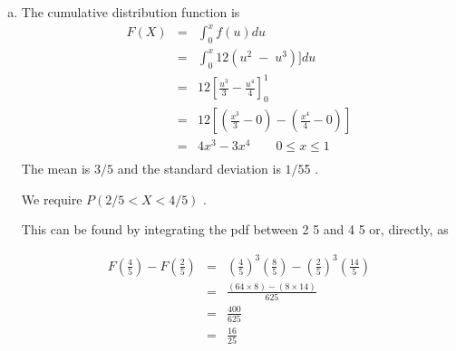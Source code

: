 \documentclass[a4paper,12pt]{article}
\begin{document}
\begin{enumerate}[(a)]
\begin{framed}
\end{framed}
\item  The cumulative distribution function is
\begin{eqnarray*}
F(X) &=& \int^{x}_{0} f(u) du \\
&=& \int^{x}_{0} 12(u^2\;-\;u^3)] du \\
&=& 12 \left[ \frac{u^3}{3} - \frac{u^4}{4}\right]^1_0\\
&=& 12 \left[ \left( \frac{x^3}{3}- 0 \right) - \left( \frac{x^4}{4}- 0 \right)  \right]\\
&=&  4x^3- 3x^4  \qquad 0 \leq x \leq 1 \\
\end{eqnarray*}
The mean is $3/5$
and the standard deviation is $1/5$5 . 

We require  $P(2/5 < X < 4/5)$ .

This can be found by integrating the pdf between 2
5 and 4
5 or, directly, as

\begin{eqnarray*}
F\left(\frac{4}{5}\right) - F\left(\frac{2}{5}\right) &=& \left(\frac{4}{5}\right)^3\left(\frac{8}{5}\right) - \left(\frac{2}{5}\right)^3\left(\frac{14}{5}\right)\\
&=& \frac{(64 \times 8) - (8 \times 14)}{625} \\
&=& \frac{400}{625} \\
&=& \frac{16}{25}
\end{eqnarray*}

\end{enumerate}
\end{document}

